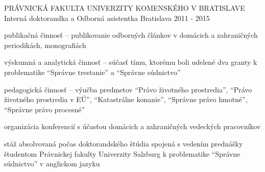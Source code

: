 \begin{cventries}
  \cventry
    {PRÁVNICKÁ FAKULTA UNIVERZITY KOMENSKÉHO V BRATISLAVE} %
    {Interná doktorandka a Odborná asistentka} %
    {Bratislava} %
    {2011 - 2015} %
    {
      \begin{cvitems} %
        \item {publikačná činnosť – publikovanie odborných článkov v domácich a zahraničných periodikách, monografiách}
        \item {výskumná a analytická činnosť – súčasť tímu, ktorému boli udelené dva granty k problematike “Správne trestanie” a “Správne súdnictvo”}
        \item {pedagogická činnosť – výučba predmetov “Právo životného prostredia”, “Právo životného prostredia v EÚ”, “Katastrálne konanie”, “Správne právo hmotné”, “Správne právo procesné”}
        \item {organizácia konferencií s účasťou domácich a zahraničných vedeckých pracovníkov}
        \item {stáž absolvovaná počas doktorandského štúdia spojená s vedením prednášky študentom Právnickej fakulty Univerzity Salzburg k problematike “Správne súdnictvo” v anglickom jazyku}
      \end{cvitems}
    }

\end{cventries}

